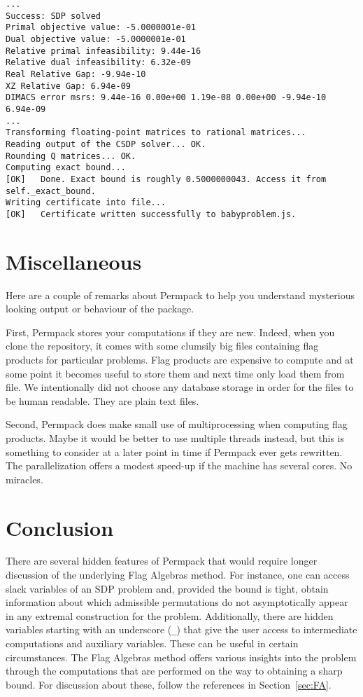\begin{lstlisting}
...
Success: SDP solved
Primal objective value: -5.0000001e-01 
Dual objective value: -5.0000001e-01 
Relative primal infeasibility: 9.44e-16 
Relative dual infeasibility: 6.32e-09 
Real Relative Gap: -9.94e-10 
XZ Relative Gap: 6.94e-09 
DIMACS error msrs: 9.44e-16 0.00e+00 1.19e-08 0.00e+00 -9.94e-10 6.94e-09
...
Transforming floating-point matrices to rational matrices...
Reading output of the CSDP solver... OK.
Rounding Q matrices... OK.
Computing exact bound...
[OK]   Done. Exact bound is roughly 0.5000000043. Access it from
self._exact_bound.
Writing certificate into file... 
[OK]   Certificate written successfully to babyproblem.js.
\end{lstlisting}


\section{Miscellaneous}
\label{sec:permpack-misc}
Here are a couple of remarks about Permpack to help you understand mysterious looking output or behaviour of the package.

First, Permpack stores your computations if they are new. Indeed, when you clone the repository, it comes with some clumsily big files containing flag products for particular problems. Flag products are expensive to compute and at some point it becomes useful to store them and next time only load them from file. We intentionally did not choose any database storage in order for the files to be human readable. They are plain text files. 

Second, Permpack does make small use of multiprocessing when computing flag products. Maybe it would be better to use multiple threads instead, but this is something to consider at a later point in time if Permpack ever gets rewritten. The parallelization offers a modest speed-up if the machine has several cores. No miracles.

\section{Conclusion}

There are several hidden features of Permpack that would require longer discussion of the underlying Flag Algebras method. For instance, one can access slack variables of an SDP problem and, provided the bound is tight, obtain information about which admissible permutations do not asymptotically appear in any extremal construction for the problem. Additionally, there are hidden variables starting with an underscore (\texttt{\_}) that give the user access to intermediate computations and auxiliary variables. These can be useful in certain circumstances. The Flag Algebras method offers various insights into the problem through the computations that are performed on the way to obtaining a sharp bound. For discussion about these, follow the references in Section~\ref{sec:FA}. 

